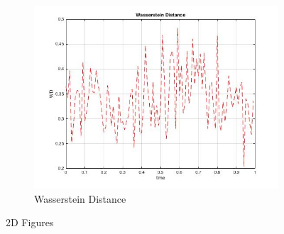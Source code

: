 \documentclass[10pt]{article}
\begin{document}
\begin{figure}
\begin{subfigure}{\linewidth}
\includegraphics[scale = .45]{WD.jpg}
  \caption{Wasserstein Distance}
\label{fig: WD}
\end{subfigure}
\caption{2D Figures}
\label{fig:test}
\end{figure}

 
\end{document}
